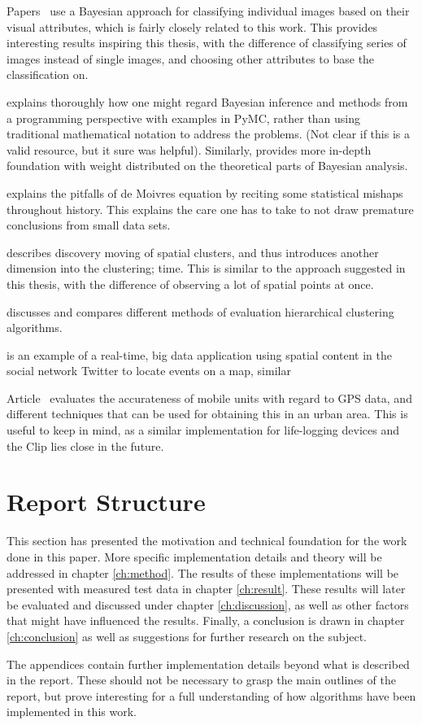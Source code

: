 Papers~\cite{content-based-classification, framework-classification} use a
Bayesian approach for classifying individual images based on their 
visual attributes, which is fairly closely related to this work. This
provides interesting results inspiring this thesis, with the difference
of classifying series of images instead of single images, and choosing
other attributes to base the classification on.

\cite{bayesian-methods-for-hackers} explains thoroughly how one might
regard Bayesian inference and methods from a programming perspective 
with examples in PyMC, rather than using traditional mathematical notation
to address the problems. 
(Not clear if this is a valid resource, but it sure was helpful).
Similarly, \cite{bayesian-theory} provides more in-depth foundation
with weight distributed on the theoretical parts of Bayesian 
analysis.

\cite{the-most-dangerous-equation} explains the pitfalls of de Moivres 
equation by reciting some statistical mishaps throughout history. This 
explains the care one has to take to not draw premature conclusions from
small data sets. 

\cite{discovering-moving-clusters} describes discovery moving of spatial 
clusters, and thus introduces another dimension into the clustering; time.
This is similar to the approach suggested in this thesis, with the 
difference of observing a lot of spatial points at once. 

\cite{hierarchical-evaluation} discusses and compares different 
methods of evaluation hierarchical clustering algorithms. 

\cite{twitter-geo} is an example of a real-time, big data application 
using spatial content in the social network Twitter to locate events
on a map, similar

Article~\cite{iphone-wifi} evaluates the accurateness of mobile units 
with regard to GPS data, and different techniques that can be used for 
obtaining this in an urban area. This is useful to keep in mind, as 
a similar implementation for life-logging devices and the Clip lies 
close in the future.

\section{Report Structure}

This section has presented the motivation and technical foundation
for the work done in this paper. More specific implementation 
details and theory will be addressed in chapter \ref{ch:method}.
The results of these implementations will be presented with 
measured test data in chapter \ref{ch:result}. These results 
will later be evaluated and discussed under chapter 
\ref{ch:discussion}, as well as other factors that might have 
influenced the results. Finally, a conclusion is drawn in chapter 
\ref{ch:conclusion} as well as suggestions for further research 
on the subject.

The appendices contain further implementation details beyond what
is described in the report. These should not be necessary to grasp
the main outlines of the report, but prove interesting for a full
understanding of how algorithms have been implemented in this work.